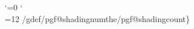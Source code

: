 \newcount\pgf@shadingcount
{}
{
  \catcode`\/=0
  \catcode`\\=12
  /gdef/pgf@shadingnum{\/the/pgf@shadingcount\}
}


\newif\ifpgfshadingmodelrgb
\newif\ifpgfshadingmodelcmyk
\newif\ifpgfshadingmodelgray
\def\pgf@setup@shading@model{%
  \pgfshadingmodelrgbtrue
  \pgfshadingmodelcmykfalse
  \pgfshadingmodelgrayfalse
  \XC@sdef\pgf@mod@test{\XC@tgt@mod{natural}}%
  \def\pgf@shading@device{/DeviceRGB}%
  \def\pgf@shading@ps@device{setrgbcolor}%
  \def\pgf@shading@functional@range{0 1 0 1 0 1}%
  \def\pgf@shading@model{rgb}%
  \ifx\pgf@mod@test\XC@mod@cmyk
    \def\pgf@shading@device{/DeviceCMYK}%
    \def\pgf@shading@ps@device{setcmykcolor}%
    \def\pgf@shading@functional@range{0 1 0 1 0 1 0 1}%
    \def\pgf@shading@model{cmyk}%
    \pgfshadingmodelrgbfalse
    \pgfshadingmodelcmyktrue
  \fi
  \ifx\pgf@mod@test\XC@mod@gray
    \def\pgf@shading@device{/DeviceGray}%
    \def\pgf@shading@ps@device{setgray}%
    \def\pgf@shading@functional@range{0 1}%
    \def\pgf@shading@model{gray}%
    \pgfshadingmodelrgbfalse
    \pgfshadingmodelgraytrue
  \fi
  \edef\pgf@sys@driver@dvisvgm{pgfsys-dvisvgm.def}%
  \ifx\pgfsysdriver\pgf@sys@driver@dvisvgm
    \def\pgf@shading@model{rgb}%
  \fi
  \edef\pgf@sys@driver@texforht{pgfsys-tex4ht.def}%
  \ifx\pgfsysdriver\pgf@sys@driver@texforht
    \def\pgf@shading@model{rgb}%
  \fi
}


%
%
%
%
%
%
% 
% 

}
